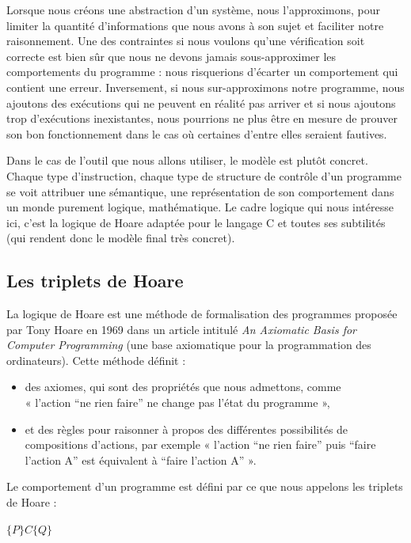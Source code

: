 \documentclass[12pt,francais,]{scrbook}
\providecommand{\tightlist}{%
  \setlength{\itemsep}{0pt}\setlength{\parskip}{0pt}}
\begin{document}
Lorsque nous créons une abstraction d'un système, nous l'approximons,
pour limiter la quantité d'informations que nous avons à son sujet et
faciliter notre raisonnement. Une des contraintes si nous voulons qu'une
vérification soit correcte est bien sûr que nous ne devons jamais
sous-approximer les comportements du programme : nous risquerions
d'écarter un comportement qui contient une erreur. Inversement, si nous
sur-approximons notre programme, nous ajoutons des exécutions qui ne
peuvent en réalité pas arriver et si nous ajoutons trop d'exécutions
inexistantes, nous pourrions ne plus être en mesure de prouver son bon
fonctionnement dans le cas où certaines d'entre elles seraient fautives.

Dans le cas de l'outil que nous allons utiliser, le modèle est plutôt
concret. Chaque type d'instruction, chaque type de structure de contrôle
d'un programme se voit attribuer une sémantique, une représentation de
son comportement dans un monde purement logique, mathématique. Le cadre
logique qui nous intéresse ici, c'est la logique de Hoare adaptée pour
le langage C et toutes ses subtilités (qui rendent donc le modèle final
très concret).

\subsection{Les triplets de Hoare}\label{les-triplets-de-hoare}

La logique de Hoare est une méthode de formalisation des programmes
proposée par Tony Hoare en 1969 dans un article intitulé \emph{An
Axiomatic Basis for Computer Programming} (une base axiomatique pour la
programmation des ordinateurs). Cette méthode définit :

\begin{itemize}
\tightlist
\item
  des axiomes, qui sont des propriétés que nous admettons, comme\\
  « l'action ``ne rien faire'' ne change pas l'état du programme »,
\item
  et des règles pour raisonner à propos des différentes possibilités de
  compositions d'actions, par exemple « l'action ``ne rien faire'' puis
  ``faire l'action A'' est équivalent à ``faire l'action A'' ».
\end{itemize}

Le comportement d'un programme est défini par ce que nous appelons les
triplets de Hoare :

\begin{center} \(\{P\} C \{Q\}\) \end{center}
\end{document}
